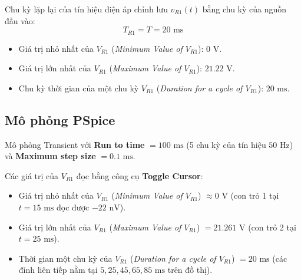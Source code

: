 \noindent Chu kỳ lặp lại của tín hiệu điện áp chỉnh lưu $v_{R1}(t)$ bằng chu kỳ của nguồn đầu vào:
\begin{equation}
  T_{R1} = T = 20\text{ ms}
\end{equation}

\begin{dapsobox}
  \begin{itemize}[leftmargin=1.5em]
    \item Giá trị nhỏ nhất của $V_{R1}$ (\textit{Minimum Value of $V_{R1}$}): $0\text{ V}$.
    \item Giá trị lớn nhất của $V_{R1}$ (\textit{Maximum Value of $V_{R1}$}): $21.22\text{ V}$.
    \item Chu kỳ thời gian của một chu kỳ $V_{R1}$ (\textit{Duration for a cycle of $V_{R1}$}): $20\text{ ms}$.
  \end{itemize}
\end{dapsobox}

\subsection{Mô phỏng PSpice}
\noindent Mô phỏng Transient với \textbf{Run to time} $= 100\text{ ms}$ (5 chu kỳ của tín hiệu $50\text{ Hz}$) và \textbf{Maximum step size} $= 0.1\text{ ms}$.

\simresult
{}

\noindent Các giá trị của $V_{R1}$ đọc bằng công cụ \textbf{Toggle Cursor}:
\begin{dapsobox}[title=Kết quả mô phỏng]
  \begin{itemize}[leftmargin=1.5em]
    \item Giá trị nhỏ nhất của $V_{R1}$ (\textit{Minimum Value of $V_{R1}$}) $\approx 0\text{ V}$ (con trỏ 1 tại $t = 15\text{ ms}$ đọc được $-22\text{ nV}$).
    \item Giá trị lớn nhất của $V_{R1}$ (\textit{Maximum Value of $V_{R1}$}) $= 21.261\text{ V}$ (con trỏ 2 tại $t = 25\text{ ms}$).
    \item Thời gian một chu kỳ của $V_{R1}$ (\textit{Duration for a cycle of $V_{R1}$}) $= 20\text{ ms}$ (các đỉnh liên tiếp nằm tại $5, 25, 45, 65, 85\text{ ms}$ trên đồ thị).
  \end{itemize}
\end{dapsobox}

